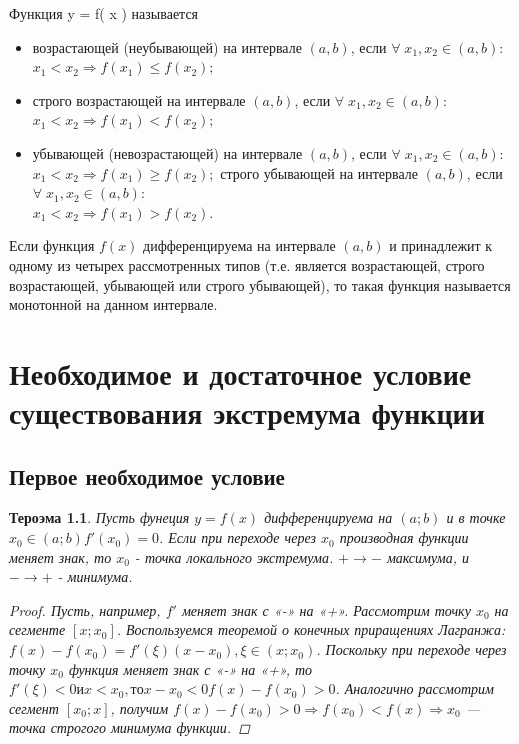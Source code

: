 \documentclass[oneside]{book}
\newtheorem{thm}{Тероэма}[chapter] %
\begin{document}
\begin{enumerate}
\begin{itemize}
\begin{enumerate}
Функция y = f\left( x \right) называется \\ 
\begin{itemize}
    \item возрастающей (неубывающей) на интервале $\left( {a,b} \right)$, если
    ${\forall\;{x_1},{x_2} \in \left( {a,b} \right):\;}$\\
    ${{x_1} < {x_2} \Rightarrow f\left( {{x_1}} \right) \leq f\left( {{x_2}} \right);}$
    \item строго возрастающей на интервале $\left( {a,b} \right)$, если
    ${\forall\;{x_1},{x_2} \in \left( {a,b} \right):\;}$\\
    ${{x_1} < {x_2} \Rightarrow f\left( {{x_1}} \right) \lt f\left( {{x_2}} \right);}$
    \item убывающей (невозрастающей) на интервале $\left( {a,b} \right)$, если
    ${\forall\;{x_1},{x_2} \in \left( {a,b} \right):\;}$\\
    ${{x_1} < {x_2} \Rightarrow f\left( {{x_1}} \right) \ge f\left( {{x_2}} \right);}$
    строго убывающей на интервале $\left( {a,b} \right)$, если
    ${\forall\;{x_1},{x_2} \in \left( {a,b} \right):\;}$\\
    ${{x_1} < {x_2} \Rightarrow f\left( {{x_1}} \right) \gt f\left( {{x_2}} \right).}$
\end{itemize}
Если функция $f\left( x \right)$ дифференцируема на интервале $\left( {a,b} \right)$ и принадлежит к одному из четырех рассмотренных типов
(т.е. является возрастающей, строго возрастающей, убывающей или строго убывающей), то такая функция называется монотонной на данном интервале. 
\setcounter{chapter}{27}         
\chapter{Необходимое и достаточное условие существования экстремума функции\\}
\section{Первое необходимое условие}
\begin{thm}
Пусть фунеция $y=f(x)$ дифференцируема на $(a;b)$ и в точке $x_0 \in (a;b) f'(x_0) = 0$. Если при переходе через $x_0$
производная функции меняет знак, то $x_0$  - точка локального экстремума. $+ \rightarrow -$ максимума, и $- \rightarrow +$ - минимума. 
\begin{proof}
Пусть, например, ${f}'$ меняет знак с «-» на «+». Рассмотрим точку $x_{0}$ на сегменте $\left [ x;x_{0} \right ]$. Воспользуемся теоремой о конечных приращениях Лагранжа: $f(x)-f(x_{0}) ={f}'(\xi)(x-x_{0}), \xi \in (x;x_{0})$. Поскольку при переходе через точку $x_{0}$ функция меняет знак с «-» на «+», то ${f}'(\xi)<0 и x< x_{0}, то x- x_{0}<0 f(x)-f(x_{0})>0$.
Аналогично рассмотрим сегмент $\left [ x_{0};x \right ]$, получим
$f(x)-f(x_{0})>0 \Rightarrow f(x_{0})< f(x) \Rightarrow   x_{0}$ — точка строгого минимума функции.
\end{proof}
\end{thm}

\end{enumerate}
\end{itemize}
\end{enumerate}
\end{document}
